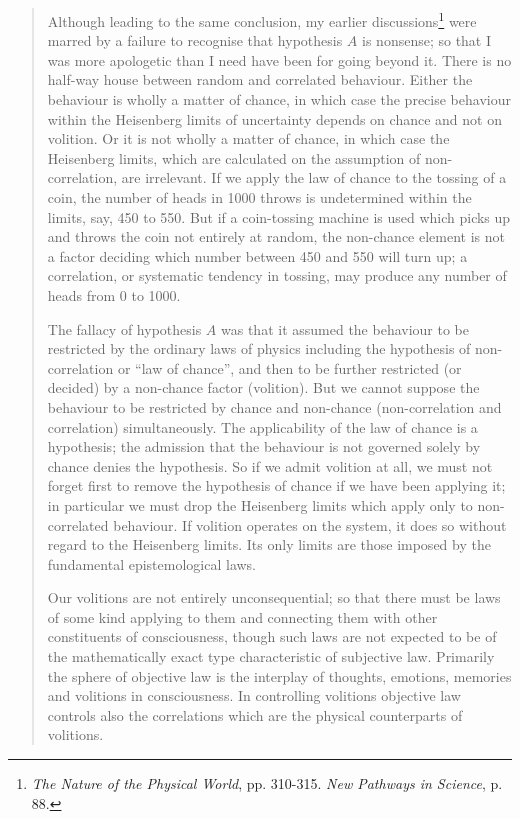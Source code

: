 \documentclass{article}
\begin{document}
\begin{quote}
    Although leading to the same conclusion, my earlier discussions\footnote{\emph{The Nature of the Physical World}, pp. 310-315.  \emph{New Pathways in Science}, p. 88.} were marred by a failure to recognise that hypothesis $A$ is nonsense; so that I was more apologetic than I need have been for going beyond it.  There is no half-way house between random and correlated behaviour.  Either the behaviour is wholly a matter of chance, in which case the precise behaviour within the Heisenberg limits of uncertainty depends on chance and not on volition.  Or it is not wholly a matter of chance, in which case the Heisenberg limits, which are calculated on the assumption of non-correlation, are irrelevant.  If we apply the law of chance to the tossing of a coin, the number of heads in 1000 throws is undetermined within the limits, say, 450 to 550.  But if a coin-tossing machine is used which picks up and throws the coin not entirely at random, the non-chance element is not a factor deciding which number between 450 and 550 will turn up; a correlation, or systematic tendency in tossing, may produce any number of heads from 0 to 1000.  

    The fallacy of hypothesis $A$ was that it assumed the behaviour to be restricted by the ordinary laws of physics including the hypothesis of non-correlation or ``law of chance'', and then to be further restricted (or decided) by a non-chance factor (volition).  But we cannot suppose the behaviour to be restricted by chance and non-chance (non-correlation and correlation) simultaneously.  The applicability of the law of chance is a hypothesis; the admission that the behaviour is not governed solely by chance denies the hypothesis.  So if we admit volition at all, we must not forget first to remove the hypothesis of chance if we have been applying it; in particular we must drop the Heisenberg limits which apply only to non-correlated behaviour.  If volition operates on the system, it does so without regard to the Heisenberg limits.  Its only limits are those imposed by the fundamental epistemological laws.  

    Our volitions are not entirely unconsequential; so that there must be laws of some kind applying to them and connecting them with other constituents of consciousness, though such laws are not expected to be of the mathematically exact type characteristic of subjective law.  Primarily the sphere of objective law is the interplay of thoughts, emotions, memories and volitions in consciousness.  In controlling volitions objective law controls also the correlations which are the physical counterparts of volitions.  


\end{quote}
\end{document}
